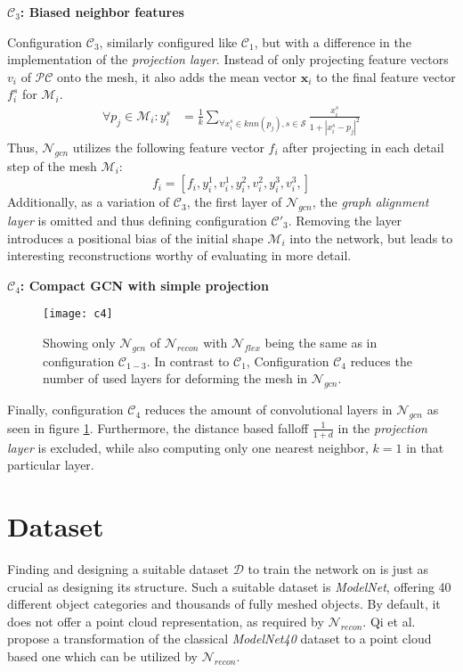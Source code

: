 \textbf{$\mathcal{C}_3$: Biased neighbor features}

Configuration $\mathcal{C}_3$, similarly configured like $\mathcal{C}_1$, but with a difference in the implementation of the \emph{projection layer}.
Instead of only projecting feature vectors $v_i$ of $\mathcal{PC}$ onto the mesh, it also adds the mean vector $\textbf{x}_i$ 
to the final feature vector $f_i^s$ for $\mathcal{M}_i$.
 \begin{align}
      \forall p_j \in \mathcal{M}_{i} : y_i^s &= \frac{1}{k}\sum_{\forall x_i^s \in knn(p_j),s\in \mathcal{S}} \frac{x_i^s}{1 + |x_i^s-p_j|^2}
   \end{align}
Thus, $\mathcal{N}_{gcn}$ utilizes the following feature vector $f_i$ after projecting in each detail step of the mesh $\mathcal{M}_i$:
\[f_i = [f_i, y_i^1, v_i^1, y_i^2, v_i^2,y_i^3, v_i^3,] \]
Additionally, as a variation of $\mathcal{C}_3$, the first layer of $\mathcal{N}_{gcn}$, the \emph{graph alignment layer} is omitted and 
thus defining configuration $\mathcal{C}'_3$. Removing the layer introduces a positional bias of the initial shape $\mathcal{M}_i$ into the network, but
leads to interesting reconstructions worthy of evaluating in more detail.

\textbf{$\mathcal{C}_4$: Compact GCN with simple projection}
\begin{figure}
   \begin{center}
   \texttt{[image: c4]}
   \caption{Showing only $\mathcal{N}_{gcn}$ of $\mathcal{N}_{recon}$ with $\mathcal{N}_{flex}$ being the same
    as in configuration $\mathcal{C}_{1-3}$. In contrast to $\mathcal{C}_1$, Configuration $\mathcal{C}_4$ reduces 
    the number of used layers for deforming the mesh in $\mathcal{N}_{gcn}$.}
   \label{fig:c4}
   \end{center}
\end{figure}
Finally, configuration $\mathcal{C}_4$ reduces the amount of convolutional layers in $\mathcal{N}_{gcn}$ as seen in figure \ref{fig:c4}.
Furthermore, the distance based falloff $\frac{1}{1+d}$ in the \emph{projection layer} is excluded, 
while also computing only one nearest neighbor, $k=1$ in that particular layer. 

\section{Dataset}
\label{dataset}
   Finding and designing a suitable dataset $\mathcal{D}$
   to train the network on is just as crucial as designing its structure. 
   Such a suitable dataset is \emph{ModelNet}, offering 40 different object 
   categories and thousands of fully meshed objects. By default, it does not offer a
   point cloud representation, as required by $\mathcal{N}_{recon}$. Qi et al.
   \cite{qi2017pointnetplusplus} propose a transformation of the classical \emph{ModelNet40}
   dataset to a point cloud based one which can be utilized by $\mathcal{N}_{recon}$.

